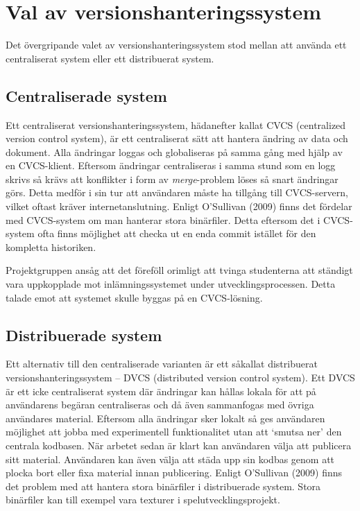 \section{Val av versionshanteringssystem}

Det övergripande valet av versionshanteringssystem stod mellan att använda ett centraliserat system eller ett distribuerat system.

\subsection{Centraliserade system}

Ett centraliserat versionshanteringssystem, hädanefter kallat CVCS (centralized version control system), är ett centraliserat sätt att hantera ändring av data och dokument. Alla ändringar loggas och globaliseras på samma gång med hjälp av en CVCS-klient. Eftersom ändringar centraliseras i samma stund som en logg skrivs så krävs att konflikter i form av \emph{merge}-problem löses så snart ändringar görs. Detta medför i sin tur att användaren måste ha tillgång till CVCS-servern, vilket oftast kräver internetanslutning.
Enligt O’Sullivan (2009) finns det fördelar med CVCS-system om man hanterar stora binärfiler. Detta eftersom det i CVCS-system ofta finns möjlighet att checka ut en enda commit istället för den kompletta historiken.

Projektgruppen ansåg att det föreföll orimligt att tvinga studenterna att ständigt vara uppkopplade mot inlämningssystemet under utvecklingsprocessen. Detta talade emot att systemet skulle byggas på en CVCS-lösning.

\subsection{Distribuerade system}

Ett alternativ till den centraliserade varianten är ett såkallat distribuerat versionshanteringssystem – DVCS (distributed version control system). 
Ett DVCS är ett icke centraliserat system där ändringar kan hållas lokala för att på användarens begäran centraliseras och då även sammanfogas med övriga användares material. Eftersom alla ändringar sker lokalt så ges användaren möjlighet att jobba med experimentell funktionalitet utan att `smutsa ner' den centrala kodbasen. När arbetet sedan är klart kan användaren välja att publicera sitt material. Användaren kan även välja att städa upp sin kodbas genom att  plocka bort eller fixa material innan publicering.
Enligt O’Sullivan (2009) finns det problem med att hantera stora binärfiler i distribuerade system. Stora binärfiler kan till exempel vara texturer i spelutvecklingsprojekt. 

